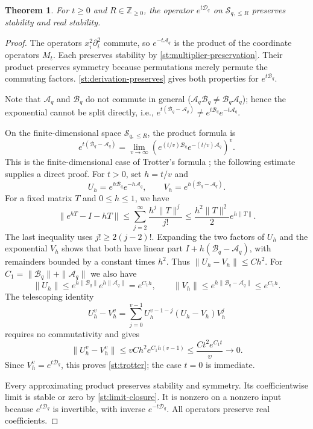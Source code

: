 \documentclass[reqno, 12pt]{article}
\numberwithin{equation}{section}
\newtheorem{theorem}{Theorem}[section]
\theoremstyle{definition}
\newcommand{\NN}{\mathbb Z_{\geq0}}
\begin{document}
\begin{theorem}\label{st:evolution-preserves}
For $t\geq0$ and $R\in\NN$, the operator $e^{t\mathcal D_q}$
on $\mathcal S_{q,\leq R}$ preserves stability and real stability.
\end{theorem}
\begin{proof}
The operators $x_i^2\partial_i^2$ commute, so
$e^{-t\mathcal A_q}$ is the product of the coordinate operators
$M_t$.  Each preserves stability by \cref{st:multiplier-preservation}.  Their product
preserves symmetry because permutations merely permute the
commuting factors. \cref{st:derivation-preserves}
gives both properties for $e^{t\mathcal B_q}$.

Note that \(\mathcal{A}_q\) and \(\mathcal{B}_q\) do not commute in general (\(\mathcal{A}_q\mathcal{B}_q \neq \mathcal{B}_q\mathcal{A}_q\)); hence the exponential cannot be split directly, i.e.,
\(e^{t(\mathcal{B}_q-\mathcal{A}_q)} \neq e^{t\mathcal{B}_q}e^{-t\mathcal{A}_q}\).

On the finite-dimensional space $\mathcal S_{q,\leq R}$, the
product formula is
\begin{equation}\label{st:trotter}
e^{t(\mathcal B_q-\mathcal A_q)}
=\lim_{v\longrightarrow\infty}
\left(e^{(t/v)\mathcal B_q}e^{-(t/v)\mathcal A_q}\right)^v.
\end{equation}
This is the finite-dimensional case of Trotter's formula
\cite{Trotter}; the following estimate supplies a direct proof.
For $t>0$, set $h=t/v$ and
\[
U_h=e^{h\mathcal B_q}e^{-h\mathcal A_q},\qquad
V_h=e^{h(\mathcal B_q-\mathcal A_q)}.
\]
For a fixed matrix $T$ and $0\leq h\leq1$, we have 
\begin{equation}\label{st:exponential-remainder}
\|e^{hT}-I-hT\|
\leq\sum_{j=2}^{\infty}\frac{h^j\|T\|^j}{j!}
\leq\frac{h^2\|T\|^2}{2}e^{h\|T\|}.
\end{equation}
The last inequality uses $j!\geq2(j-2)!$.
Expanding the two factors of $U_h$ and the exponential $V_h$
shows that both have linear part
$I+h(\mathcal B_q-\mathcal A_q)$, with remainders bounded by
a constant times $h^2$.  Thus $\|U_h-V_h\|\leq Ch^2$.
For $C_1=\|\mathcal B_q\|+\|\mathcal A_q\|$ we also have
\[
\|U_h\|\leq e^{h\|\mathcal B_q\|}e^{h\|\mathcal A_q\|}
=e^{C_1h},\qquad
\|V_h\|\leq e^{h\|\mathcal B_q-\mathcal A_q\|}
\leq e^{C_1h}.
\]
The telescoping identity
\[
U_h^v-V_h^v
=\sum_{j=0}^{v-1}U_h^{v-1-j}(U_h-V_h)V_h^j
\]
requires no commutativity and gives
\[
\|U_h^v-V_h^v\|
\leq v C h^2 e^{C_1h(v-1)}
\leq \frac{Ct^2e^{C_1t}}{v}\longrightarrow0.
\]
Since $V_h^v=e^{t\mathcal D_q}$, this proves
\eqref{st:trotter}; the case $t=0$ is immediate.

Every approximating product preserves stability and symmetry.
Its coefficientwise limit is stable or zero by \cref{st:limit-closure}.  It is nonzero on a nonzero input
because $e^{t\mathcal D_q}$ is invertible, with inverse
$e^{-t\mathcal D_q}$.  All operators preserve real coefficients.
\end{proof}
\end{document}
